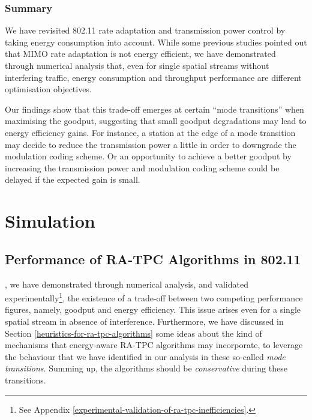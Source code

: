 \documentclass[twoside,nohyper]{tufte-book}
\newcommand{\partseparator}{
  \noindent\leavevmode\leaders\hrule height 0.8ex depth \dimexpr0.4pt-0.8ex\hfill\kern0pt
  \newline~\vspace{-0.5\baselineskip}\newline}
\theoremstyle{definition}
\theoremstyle{definition}
\theoremstyle{definition}
\theoremstyle{remark}
\begin{document}
\section{Summary}\label{summary-3}

We have revisited 802.11 rate adaptation and transmission power control
by taking energy consumption into account. While some previous studies
pointed out that MIMO rate adaptation is not energy efficient, we have
demonstrated through numerical analysis that, even for single spatial
streams without interfering traffic, energy consumption and throughput
performance are different optimisation objectives.

Our
findings\cite[0pt]{contrib-06}
show that this trade-off emerges at certain ``mode transitions'' when
maximising the goodput, suggesting that small goodput degradations may
lead to energy efficiency gains. For instance, a station at the edge of
a mode transition may decide to reduce the transmission power a little
in order to downgrade the modulation coding scheme. Or an opportunity to
achieve a better goodput by increasing the transmission power and
modulation coding scheme could be delayed if the expected gain is small.

\addtocontents{toc}{\partseparator}

\part{Simulation}\label{part-simulation}

\chapter{Performance of RA-TPC Algorithms in 802.11}\label{ch:07}

, we have demonstrated through numerical analysis,
and validated experimentally\footnote{See Appendix
  \ref{experimental-validation-of-ra-tpc-inefficiencies}.}, the
existence of a trade-off between two competing performance figures,
namely, goodput and energy efficiency. This issue arises even for a
single spatial stream in absence of interference. Furthermore, we have
discussed in Section \ref{heuristics-for-ra-tpc-algorithms} some ideas
about the kind of mechanisms that energy-aware RA-TPC algorithms may
incorporate, to leverage the behaviour that we have identified in our
analysis in these so-called \emph{mode transitions}. Summing up, the
algorithms should be \emph{conservative} during these transitions.
\end{document}
